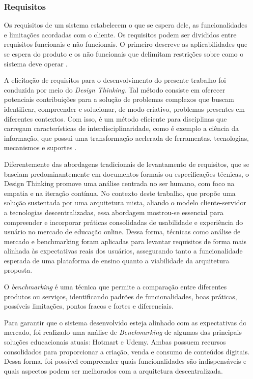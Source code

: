         \subsubsection{Requisitos}
        Os requisitos de um sistema estabelecem o que se espera dele, as funcionalidades e limitações acordadas com o cliente. Os requisitos podem ser divididos entre requisitos funcionais e não funcionais. O primeiro descreve as aplicabilidades que se espera do produto e os não funcionais que delimitam restrições sobre como o sistema deve operar \cite{sommerville2011}.

        A elicitação de requisitos para o desenvolvimento do presente trabalho foi conduzida por meio do \textit{Design Thinking}. Tal método consiste em oferecer potenciais contribuições para a solução de problemas complexos que buscam identificar, compreender e solucionar, de modo criativo, problemas presentes em diferentes contextos. Com isso, é um método eficiente para disciplinas que carregam características de interdisciplinaridade, como é exemplo a ciência da informação, que possui uma transformação acelerada de ferramentas, tecnologias, mecanismos e suportes \cite{apocalypse2022}.

        Diferentemente das abordagens tradicionais de levantamento de requisitos, que se baseiam predominantemente em documentos formais ou especificações técnicas, o Design Thinking promove uma análise centrada no ser humano, com foco na empatia e na iteração contínua. No contexto deste trabalho, que propõe uma solução sustentada por uma arquitetura mista, aliando o modelo cliente-servidor a tecnologias descentralizadas, essa abordagem mostrou-se essencial para compreender e incorporar práticas consolidadas de usabilidade e experiência do usuário no mercado de educação online. Dessa forma, técnicas como análise de mercado e benchmarking foram aplicadas para levantar requisitos de forma mais alinhada às expectativas reais dos usuários, assegurando tanto a funcionalidade esperada de uma plataforma de ensino quanto a viabilidade da arquitetura proposta.

        O \textit{benchmarking} é uma técnica que permite a comparação entre diferentes produtos ou serviços, identificando padrões de funcionalidades, boas práticas, possíveis limitações, pontos fracos e fortes e diferenciais.

        Para garantir que o sistema desenvolvido esteja alinhado com as expectativas do mercado, foi realizado uma análise de \textit{Benchmarking} de algumas das principais soluções educacionais atuais: Hotmart e Udemy. Ambas possuem recursos consolidados para proporcionar a criação, venda e consumo de conteúdos digitais. Dessa forma, foi possível compreender quais funcionalidades são indispensáveis e quais aspectos podem ser melhorados com a arquitetura descentralizada.


